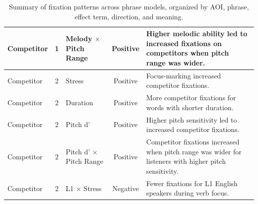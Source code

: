 \begin{table}[h]
{\begin{tabular}{|l|c|l|c|l|}
        Competitor & 1 & Melody $\times$ Pitch Range & Positive & Higher melodic ability led to increased fixations on competitors when pitch range was wider. \\
        \hline
        Competitor & 2 & Stress & Positive & Focus-marking increased competitor fixations. \\
        Competitor & 2 & Duration & Positive & More competitor fixations for words with shorter duration. \\
        Competitor & 2 & Pitch d' & Positive & Higher pitch sensitivity led to increased competitor fixations. \\
        Competitor & 2 & Pitch d' $\times$ Pitch Range & Positive & Competitor fixations increased when pitch range was wider for listeners with higher pitch sensitivity. \\
        Competitor & 2 & L1 $\times$ Stress & Negative & Fewer fixations for L1 English speakers during verb focus. \\
        \hline
    \end{tabular}
    }
    \caption{Summary of fixation patterns across phrase models, organized by AOI, phrase, effect term, direction, and meaning.}
    \label{tab:fixation_patterns}
\end{table}


